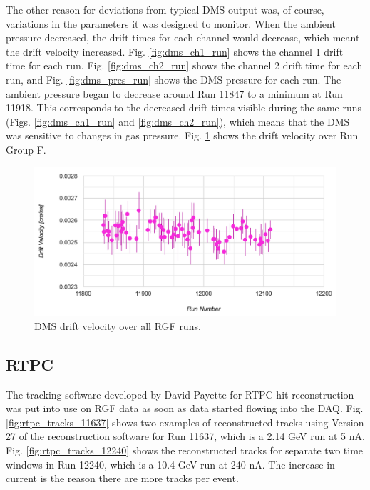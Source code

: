 The other reason for deviations from typical DMS output was, of course, variations in the parameters it was designed to monitor. When the ambient pressure decreased, the drift times for each channel would decrease, which meant the drift velocity increased. Fig. \ref{fig:dms_ch1_run} shows the channel 1 drift time for each run. Fig. \ref{fig:dms_ch2_run} shows the channel 2 drift time for each run, and Fig. \ref{fig:dms_pres_run} shows the DMS pressure for each run. The ambient pressure began to decrease around Run 11847 to a minimum at Run 11918. This corresponds to the decreased drift times visible during the same runs (Figs. \ref{fig:dms_ch1_run} and \ref{fig:dms_ch2_run}), which means that the DMS was sensitive to changes in gas pressure. Fig. \ref{fig:dms_vel_run} shows the drift velocity over Run Group F.
 
\begin{figure}[h!]
	\centering
	\includegraphics[width=0.9\linewidth]{figures/DMS_vel_run.png}
	\caption{DMS drift velocity over all RGF runs.}
	\label{fig:dms_vel_run}
\end{figure}

\newpage
\subsection{RTPC}
The tracking software developed by David Payette for RTPC hit reconstruction was put into use on RGF data as soon as data started flowing into the DAQ. Fig. \ref{fig:rtpc_tracks_11637} shows two examples of reconstructed tracks using Version 27 of the reconstruction software for Run 11637, which is a 2.14 GeV run at 5 nA. Fig. \ref{fig:rtpc_tracks_12240} shows the reconstructed tracks for separate two time windows in Run 12240, which is a 10.4 GeV run at 240 nA. The increase in current is the reason there are more tracks per event.

